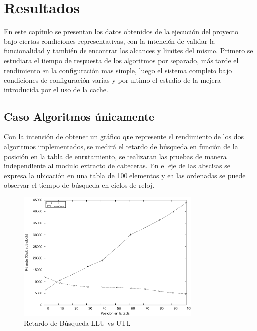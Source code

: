 \chapter{Resultados}

En este capítulo se presentan los datos obtenidos de la ejecución del proyecto bajo ciertas condiciones representativas, con la intención de validar la funcionalidad y también de encontrar los alcances y limites del mismo. Primero se estudiara el tiempo de respuesta de los algoritmos por separado, más tarde el rendimiento en la configuración mas simple, luego el sistema completo bajo condiciones de configuración varias y por ultimo el estudio de la mejora introducida por el uso de la cache.


\section{Caso Algoritmos únicamente}

Con la intención de obtener un gráfico que represente el rendimiento de los dos algoritmos implementados, se medirá el retardo de búsqueda en función de la posición en la tabla de enrutamiento, se realizaran las pruebas de manera independiente al modulo extracto de cabeceras. En el eje de las abscisas se expresa la ubicación en una tabla de 100 elementos y en las ordenadas se puede observar el tiempo de búsqueda en ciclos de reloj.

\begin{figure}[h]
  \centering
	\includegraphics[width=0.8\textwidth]{5-resultados/graf/llu-utlsof.eps}
  \caption{Retardo de Búsqueda LLU vs UTL}
  \label{fig}
\end{figure}

\newpage
